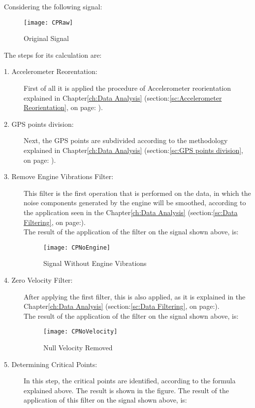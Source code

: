 \documentclass[tesi]{subfiles}
\begin{document}
\noindent Considering the following signal:

\begin{figure}[H]
\centering
\texttt{[image: CPRaw]}
\caption{Original Signal}
\end{figure}


\noindent The steps for its calculation are:
\begin{description}
\item[1. Accelerometer Reorentation:] First of all it is applied the procedure of Accelerometer reorientation explained in Chapter\ref{ch:Data Analysis} (section:\ref{sc:Accelerometer Reorientation}, on page: \pageref{sc:Accelerometer Reorientation}).
\item[2. GPS points division:] Next, the GPS points are subdivided according to the methodology explained in Chapter\ref{ch:Data Analysis} (section:\ref{sc:GPS points division}, on page: \pageref{sc:GPS points division}).
\item[3. Remove Engine Vibrations Filter:] This filter is the first operation that is performed on the data, in which the noise components generated by the engine will be smoothed, according to the application seen in the Chapter\ref{ch:Data Analysis} (section:\ref{sc:Data Filtering}, on page:\pageref{sssc:Remove Engine Vibrations Filter}).\\
The result of the application of the filter on the signal shown above, is:
 \begin{figure}[H]
\centering
\texttt{[image: CPNoEngine]}
\caption{Signal Without Engine Vibrations}
\end{figure}
\item[4. Zero Velocity Filter:] After applying the first filter, this is also applied, as it is explained in the Chapter\ref{ch:Data Analysis} (section:\ref{sc:Data Filtering}, on page:\pageref{sssc:Zero Velocity Filter}).\\
The result of the application of the filter on the signal shown above, is:
 \begin{figure}[H]
\centering
\texttt{[image: CPNoVelocity]}
\caption{Null Velocity Removed}
\end{figure}
\item[5. Determining Critical Points:] In this step, the critical points are identified, according to the formula explained above. The result is shown in the figure.
The result of the application of this filter on the signal shown above, is:
 \begin{figure}[H]
\centering

\end{figure}
\end{description}
\end{document}
